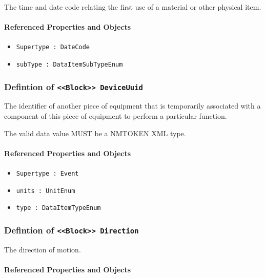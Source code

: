 The time and date code relating the first use of a material or other physical item.

\FloatBarrier
\paragraph{Referenced Properties and Objects}

\begin{itemize}
\item \texttt{Supertype : DateCode}

\item \texttt{subType : DataItemSubTypeEnum}

\end{itemize}
\FloatBarrier
\subsubsection{Defintion of \texttt{<<Block>> DeviceUuid}}
  \label{type:DeviceUuid}

\FloatBarrier

The identifier of another piece of equipment that is temporarily associated with a component of this piece of equipment to perform a particular function.
  
 The valid data value MUST be a NMTOKEN XML type.

\FloatBarrier
\paragraph{Referenced Properties and Objects}

\begin{itemize}
\item \texttt{Supertype : Event}

\item \texttt{units : UnitEnum}

\item \texttt{type : DataItemTypeEnum}

\end{itemize}
\FloatBarrier
\subsubsection{Defintion of \texttt{<<Block>> Direction}}
  \label{type:Direction}

\FloatBarrier

The direction of motion.

\FloatBarrier
\paragraph{Referenced Properties and Objects}

